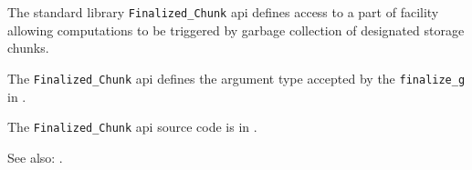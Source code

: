 
The standard library {\tt Finalized\_Chunk} api defines access to a part of facility allowing 
computations to be triggered by garbage collection of designated storage chunks.

The {\tt Finalized\_Chunk} api defines the argument type accepted by the 
{\tt finalize\_g} in .

The {\tt Finalized\_Chunk} api source code is in .

See also:   .



